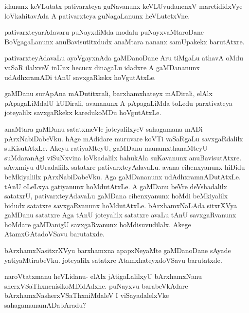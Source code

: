 \documentclass{article}
\begin{document}
\begin{mng}%
idanunx keVLutatx pativarxteya guNavanunx keVLUvudanenxV maretididxVye
loVkahitavAda A pativarxteya guNagaLanunx heVLutetxVne.
\end{mng}

\begin{mng}%
pativarxteyarAdavaru puNayxdiMda modalu puNayxvaMtaroDane
BoVgagaLanunx anuBavisutitxdudx anaMtara nananx samUpakekx barutAtxre.
\end{mng}

\begin{mng}%
pativarxteyAdavaLu ayoVgayxnAda gaMDanoDane Aru tiMgaLu
athavA oMdu vaSaR ilalxveV inUnx hecucx dinagaLu idadxre A gaMDananunx
udAdhxramADi tAnU savxgaRkekx hoVgutAtxLe.
\end{mng}

\begin{mng}%
gaMDanu surApAna mADutitxrali, barxhamxhateyx mADirali, elAlx
pApagaLiMdalU kUDirali, avananunx A pApagaLiMda toLedu parxtivateya
joteyalilx savxgaRkekx karedukoMDu hoVgutAtxLe.
\end{mng}

\begin{mng}%
anaMtara gaMDanu satatxmeVle joteyalilxyeV sahagamana
mADi pArxNabiDabeVku. hAge mAdidare muruvare koVTi vaSaRgaLu
savxgaRdalilx suKisutAtxLe. Akeyu ratiyaMteyU, gaMDanu manamxthanaMteyU
suMdaranAgi viSuNxvina loVkadalilx bahukAla suKavanunx anuBavisutAtxre.
sAvxmiyu dUradaliilx satatxre pativarxteyAdavaLu. avana cihenxyanunx hiDidu
beMkiyaliilx pArxNabiDabeVku. Aga gaMDananunx udAdhxramnADutAtxLe. tAnU
oLeLxya gatiyanunx hoMdutAtxLe. A gaMDanu beVre deVshadalilx satatxrU,
pativarxteyAdavaLu gaMDana cihenxyanunx hoMdi beMkiyalilx bidudx satatxre
savxgaRvanunx hoMdutAtxLe. bArxhamxNaLAda sitxrXVya gaMDanu satatxre Aga
tAnU joteyalilx satatxre avaLu tAnU savxgaRvanunx hoMdare gaMDanigU
savxgaRvanunx hoMdisuvudilalx. Akege AtamxGAtadoVSavu barutatxde.
\end{mng}

\begin{mng}%
bArxhamxNasitxrXVyu barxhamxna apapxNeyaMte gaMDanoDane sAyade
yatiyaMtirabeVku. joteyalilx satatxre AtamxhateyxdoVSavu barutatxde.
\end{mng}

\begin{mng}%
naroVtatxmanu heVLidanu- elAlx jAtigaLalilxyU bArxhamxNanu
sherxVSaThxnenisikoMDidAdxne. puNayxvu barabeVkAdare bArxhamxNasherxVSaThxniMdaleV I
viSayadalelxVke sahagamanamADabAradu?
\end{mng}
\end{document}
